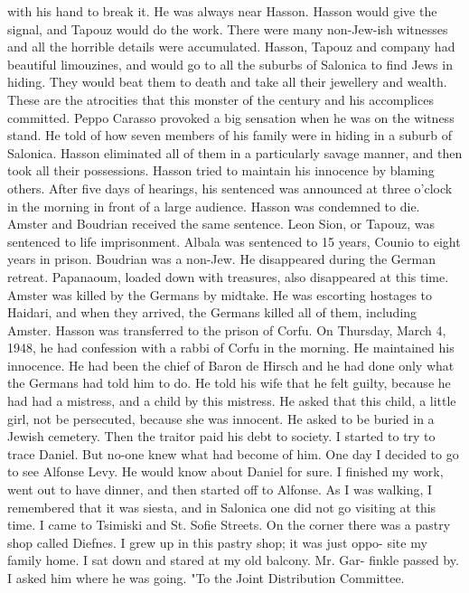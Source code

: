 with his hand to break it.
He was always near Hasson.
Hasson would 
give the signal, and Tapouz would do the work.
There were many non-Jew-ish witnesses and all the horrible details were accumulated.
Hasson, Tapouz and company had beautiful limouzines, and would go to all the suburbs of Salonica to find Jews in hiding.
They would beat them to death 
and take all their jewellery and wealth.
These are the atrocities that 
this monster of the century and his accomplices committed.
Peppo Carasso provoked a big sensation when he was on the witness 
stand.
He told of how seven members of his family were in hiding in a 
suburb of Salonica.
Hasson eliminated all of them in a particularly savage manner, and then took all their possessions.
Hasson tried to maintain his innocence by blaming others.
After 
five days of hearings, his sentenced was announced at three o'clock in 
the morning in front of a large audience.
Hasson was condemned to die.
Amster and Boudrian received the same sentence.
Leon Sion, or Tapouz, 
was sentenced to life imprisonment.
Albala was sentenced to 15 years, 
Counio to eight years in prison.
Boudrian was a non-Jew.
He disappeared during the German retreat.
Papanaoum, loaded down with treasures, 
also disappeared at this time.
Amster was killed by the Germans by midtake.
He was escorting hostages to Haidari, and when they arrived, the 
Germans killed all of them, including Amster.
Hasson was transferred to the prison of Corfu.
On Thursday, March 
4, 1948, he had confession with a rabbi of Corfu in the morning.
He 
maintained his innocence.
He had been the chief of Baron de Hirsch and 
he had done only what the Germans had told him to do.
He told his wife 
that he felt guilty, because he had had a mistress, and a child by this 
mistress.
He asked that this child, a little girl, not be persecuted, 
because she was innocent.
He asked to be buried in a Jewish cemetery.
Then the traitor paid his debt to society.
I started to try to trace Daniel.
But no-one knew what had become 
of him.
One day I decided to go to see Alfonse Levy.
He would know 
about Daniel for sure.
I finished my work, went out to have dinner, 
and then started off to Alfonse.
As I was walking, I remembered that 
it was siesta, and in Salonica one did not go visiting at this time.
I 
came to Tsimiski and St.
Sofie Streets.
On the corner there was a pastry 
shop called Diefnes.
I grew up in this pastry shop; it was just oppo-
site my family home.
I sat down and stared at my old balcony.
Mr.
Gar-
finkle passed by.
I asked him where he was going.
"To the Joint Distribution Committee.
